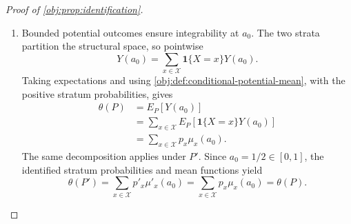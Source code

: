 \begin{proof}[Proof of \cref{obj:prop:identification}]
\begin{enumerate}
The lower design envelope makes \(g_x(t)>0\) for Lebesgue-almost every \(t\) in the full latent interval: the possible exceptional point \(t=0\) is null. Thus, for every Borel \(B\subseteq\mathbb R\),
\[
\nu_{0x}(B)=\int_{B\cap[-1/2,1/2]}g_x(t)\,dt=0
\quad\Longrightarrow\quad
\int_{B\cap[-1/2,1/2]}1\,dt=0.
\]
Indeed, a zero integral of the nonnegative density forces it to vanish almost everywhere on that set, and its almost-everywhere positivity forces the set to be Lebesgue-null. The mean equality consequently transfers to Lebesgue-almost every centered dose:
\[
\mu_x(t+a_0)=\mu'_x(t+a_0)
\qquad
\text{for Lebesgue-almost every }t\in[-1/2,1/2].
\]

For \(t,t'\in[-1/2,1/2]\), the two Hölder bounds give
\[
\begin{aligned}
|\mu_x(t+a_0)-\mu_x(t'+a_0)|&\le|t-t'|^\beta,\\
|\mu'_x(t+a_0)-\mu'_x(t'+a_0)|&\le|t-t'|^\beta.
\end{aligned}
\]
Since \(\beta>0\), both centered mean functions are continuous on the closed interval. If they differed at any point, continuity would preserve their difference on a relative neighborhood of that point. Every such neighborhood has positive Lebesgue measure, including at either endpoint, contradicting their almost-everywhere agreement. Hence
\[
\mu_x(t+a_0)=\mu'_x(t+a_0)
\qquad
\text{for every }t\in[-1/2,1/2].
\]
For every \(a\in[0,1]\),
\[
a-a_0\in[-1/2,1/2],
\qquad
(a-a_0)+a_0=a.
\]
Substitution therefore proves
\[
\mu_x(a)=\mu'_x(a)
\qquad
\text{for every }a\in[0,1].
\]
Since \(x\) was arbitrary, all the preceding conclusions hold in both strata.

\item Bounded potential outcomes ensure integrability at \(a_0\). The two strata partition the structural space, so pointwise
\[
Y(a_0)=\sum_{x\in\mathcal X}\mathbf1\{X=x\}Y(a_0).
\]
Taking expectations and using \cref{obj:def:conditional-potential-mean}, with the positive stratum probabilities, gives
\[
\begin{aligned}
\theta(P)
&=E_P[Y(a_0)]\\
&=\sum_{x\in\mathcal X}E_P[\mathbf1\{X=x\}Y(a_0)]\\
&=\sum_{x\in\mathcal X}p_x\mu_x(a_0).
\end{aligned}
\]
The same decomposition applies under \(P'\). Since \(a_0=1/2\in[0,1]\), the identified stratum probabilities and mean functions yield
\[
\theta(P')
=\sum_{x\in\mathcal X}p'_x\mu'_x(a_0)
=\sum_{x\in\mathcal X}p_x\mu_x(a_0)
=\theta(P).
\]
\end{enumerate}
\end{proof}

